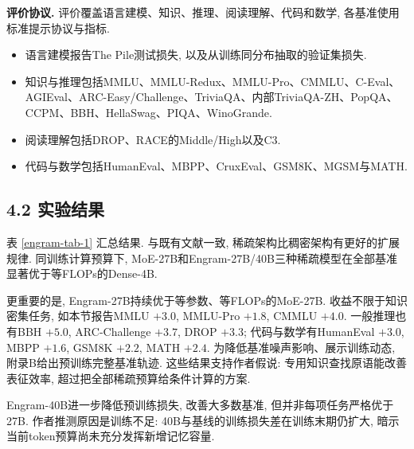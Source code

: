 \noindent\textbf{评价协议.}
评价覆盖语言建模、知识、推理、阅读理解、代码和数学, 各基准使用标准提示协议与指标.
\begin{itemize}
\item 语言建模报告The Pile\cite{engram-gao2020pile}测试损失, 以及从训练同分布抽取的验证集损失.
\item 知识与推理包括MMLU\cite{engram-hendrycks2020measuring}、MMLU-Redux\cite{engram-gema2025we}、MMLU-Pro\cite{engram-wang2024mmlu}、CMMLU\cite{engram-li2024cmmlu}、C-Eval\cite{engram-huang2023c}、AGIEval\cite{engram-zhong2024agieval}、ARC-Easy/Challenge\cite{engram-clark2018think}、TriviaQA\cite{engram-joshi2017triviaqa}、内部TriviaQA-ZH、PopQA\cite{engram-mallen2023not}、CCPM\cite{engram-li2021ccpm}、BBH\cite{engram-suzgun2023challenging}、HellaSwag\cite{engram-zellers2019hellaswag}、PIQA\cite{engram-bisk2020piqa}、WinoGrande\cite{engram-sakaguchi2021winogrande}.
\item 阅读理解包括DROP\cite{engram-dua2019drop}、RACE的Middle/High\cite{engram-lai2017race}以及C3\cite{engram-sun2020investigating}.
\item 代码与数学包括HumanEval\cite{engram-chen2021evaluatinglargelanguagemodels}、MBPP\cite{engram-austin2021program}、CruxEval\cite{engram-gu2024cruxeval}、GSM8K\cite{engram-cobbe2021training}、MGSM\cite{engram-shi2022language}与MATH\cite{engram-hendrycks2021measuring}.
\end{itemize}



\subsection*{4.2 实验结果}
表 \ref{engram-tab-1} 汇总结果. 与既有文献\cite{engram-shazeer2017outrageously,engram-he2024mixture,engram-borgeaud2022improving}一致, 稀疏架构比稠密架构有更好的扩展规律. 同训练计算预算下, MoE-27B和Engram-27B/40B三种稀疏模型在全部基准显著优于等FLOPs的Dense-4B.

更重要的是, Engram-27B持续优于等参数、等FLOPs的MoE-27B. 收益不限于知识密集任务, 如本节报告MMLU $+3.0$, MMLU-Pro $+1.8$, CMMLU $+4.0$. 一般推理也有BBH $+5.0$, ARC-Challenge $+3.7$, DROP $+3.3$; 代码与数学有HumanEval $+3.0$, MBPP $+1.6$, GSM8K $+2.2$, MATH $+2.4$. 为降低基准噪声影响、展示训练动态, 附录B给出预训练完整基准轨迹. 这些结果支持作者假说: 专用知识查找原语能改善表征效率, 超过把全部稀疏预算给条件计算的方案.

Engram-40B进一步降低预训练损失, 改善大多数基准, 但并非每项任务严格优于27B. 作者推测原因是训练不足: 40B与基线的训练损失差在训练末期仍扩大, 暗示当前token预算尚未充分发挥新增记忆容量.

